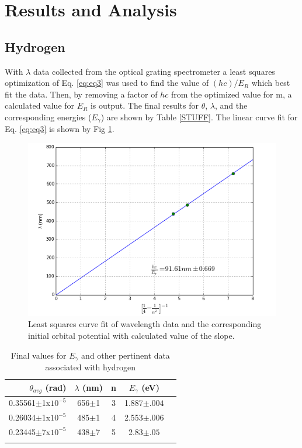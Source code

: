\documentclass[prb,preprint]{revtex4-1}
\begin{document}
\section{Results and Analysis}
\subsection{Hydrogen}
With $\lambda$ data collected from the optical grating spectrometer a least squares optimization of Eq. \eqref{eq:eq3} was used to find the value of $(hc)/E_R$ which best fit the data. Then, by removing a factor of $hc$ from the optimized value for m, a calculated value for $E_R$ is output. The final results for $\theta$, $\lambda$, and the corresponding energies ($E_\gamma$) are shown by Table \ref{STUFF}. The linear curve fit for Eq. \eqref{eq:eq3} is shown by Fig \ref{linfit}.

\begin{figure}[h]
\centering
\includegraphics[width=\textwidth]{linfit.png}
\caption{Least squares curve fit of wavelength data and the corresponding initial orbital potential with calculated value of the slope.}
\label{linfit}
\end{figure}

\begin{table}[h!]
\caption{Final values for $E_\gamma$ and other pertinent data associated with hydrogen}
\begin{ruledtabular}
\begin{tabular}{r c c c p{4 cm}}
$\theta_{avg}$ (rad)&$\lambda$ (nm)&n&$E_{\gamma}$ (eV)
\\
\hline
0.35561$\pm$1x$10^{-5}$&656$\pm$1&3&1.887$\pm.004$\\
0.26034$\pm$1x$10^{-5}$&485$\pm$1&4&2.553$\pm.006$\\
0.23445$\pm$7x$10^{-5}$&438$\pm$7&5&2.83$\pm.05$\\
\label{STUFF}
\end{tabular}
\end{ruledtabular}
\label{table I}
\end{table}
\end{document}
